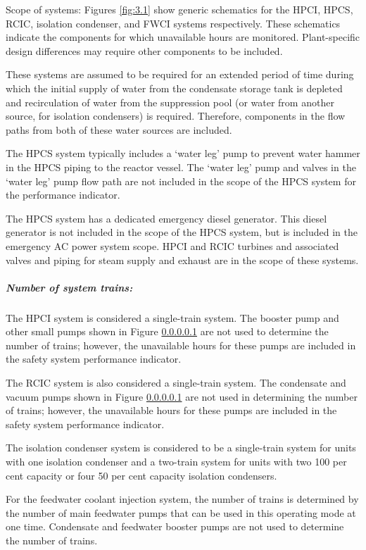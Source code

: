 Scope of systems:  Figures \ref{fig:3.1} show generic
schematics for the HPCI, HPCS, RCIC, isolation condenser, and FWCI
systems respectively. These schematics indicate the components for
which unavailable hours are monitored. Plant-specific design
differences may require other components to be included.

These systems are assumed to be required for an extended period of
time during which the initial supply of water from the condensate
storage tank is depleted and recirculation of water from the
suppression pool (or water from another source, for isolation
condensers) is required. Therefore, components in the flow paths from
both of these water sources are included.

The HPCS system typically includes a ‘water leg’ pump to prevent water
hammer in the HPCS piping to the reactor vessel. The ‘water leg’ pump
and valves in the ‘water leg’ pump flow path are not included in the
scope of the HPCS system for the performance indicator.

The HPCS system has a dedicated emergency diesel generator. This diesel generator is not included in the scope of the HPCS system, but is included in the emergency AC power system scope.
HPCI and RCIC turbines and associated valves and piping for steam
supply and exhaust are in the scope of these systems.

\subparagraph{Number of system trains:}  The HPCI system is considered
a single-train system. The booster pump and other small pumps shown in
Figure \ref{} are not used to determine the number of trains; however,
the unavailable hours for these pumps are included in the safety
system performance indicator.

The RCIC system is also considered a single-train system. The
condensate and vacuum pumps shown in Figure \ref{} are not used in
determining the number of trains; however, the unavailable hours for
these pumps are included in the safety system performance indicator.

The isolation condenser system is considered to be a single-train
system for units with one isolation condenser and a two-train system
for units with two 100 per cent capacity or four 50 per cent capacity
isolation condensers.

For the feedwater coolant injection system, the number of trains is
determined by the number of main feedwater pumps that can be used in
this operating mode at one time. Condensate and feedwater booster
pumps are not used to determine the number of trains.

